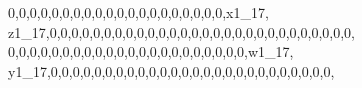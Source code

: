 \documentclass[]{article}
\newenvironment{Shaded}{\begin{snugshade}}{\end{snugshade}}
\newcommand{\DecValTok}[1]{\textcolor[rgb]{0.00,0.00,0.81}{#1}}
\newcommand{\NormalTok}[1]{#1}
\begin{document}
\begin{Shaded}
\begin{Highlighting}[]
\DecValTok{0}\NormalTok{,}\DecValTok{0}\NormalTok{,}\DecValTok{0}\NormalTok{,}\DecValTok{0}\NormalTok{,}\DecValTok{0}\NormalTok{,}\DecValTok{0}\NormalTok{,}\DecValTok{0}\NormalTok{,}\DecValTok{0}\NormalTok{,}\DecValTok{0}\NormalTok{,}\DecValTok{0}\NormalTok{,}\DecValTok{0}\NormalTok{,}\DecValTok{0}\NormalTok{,}\DecValTok{0}\NormalTok{,}\DecValTok{0}\NormalTok{,}\DecValTok{0}\NormalTok{,}\DecValTok{0}\NormalTok{,}\DecValTok{0}\NormalTok{,}\DecValTok{0}\NormalTok{,}\DecValTok{0}\NormalTok{,}\DecValTok{0}\NormalTok{,x1_}\DecValTok{17}\NormalTok{, z1_}\DecValTok{17}\NormalTok{,}\DecValTok{0}\NormalTok{,}\DecValTok{0}\NormalTok{,}\DecValTok{0}\NormalTok{,}\DecValTok{0}\NormalTok{,}\DecValTok{0}\NormalTok{,}\DecValTok{0}\NormalTok{,}\DecValTok{0}\NormalTok{,}\DecValTok{0}\NormalTok{,}\DecValTok{0}\NormalTok{,}\DecValTok{0}\NormalTok{,}\DecValTok{0}\NormalTok{,}\DecValTok{0}\NormalTok{,}\DecValTok{0}\NormalTok{,}\DecValTok{0}\NormalTok{,}\DecValTok{0}\NormalTok{,}\DecValTok{0}\NormalTok{,}\DecValTok{0}\NormalTok{,}\DecValTok{0}\NormalTok{,}\DecValTok{0}\NormalTok{,}\DecValTok{0}\NormalTok{,}\DecValTok{0}\NormalTok{,}\DecValTok{0}\NormalTok{,}\DecValTok{0}\NormalTok{,}\DecValTok{0}\NormalTok{,}\DecValTok{0}\NormalTok{,}\DecValTok{0}\NormalTok{,}\DecValTok{0}\NormalTok{,}\DecValTok{0}\NormalTok{,}
\DecValTok{0}\NormalTok{,}\DecValTok{0}\NormalTok{,}\DecValTok{0}\NormalTok{,}\DecValTok{0}\NormalTok{,}\DecValTok{0}\NormalTok{,}\DecValTok{0}\NormalTok{,}\DecValTok{0}\NormalTok{,}\DecValTok{0}\NormalTok{,}\DecValTok{0}\NormalTok{,}\DecValTok{0}\NormalTok{,}\DecValTok{0}\NormalTok{,}\DecValTok{0}\NormalTok{,}\DecValTok{0}\NormalTok{,}\DecValTok{0}\NormalTok{,}\DecValTok{0}\NormalTok{,}\DecValTok{0}\NormalTok{,}\DecValTok{0}\NormalTok{,}\DecValTok{0}\NormalTok{,}\DecValTok{0}\NormalTok{,}\DecValTok{0}\NormalTok{,}\DecValTok{0}\NormalTok{,}\DecValTok{0}\NormalTok{,w1_}\DecValTok{17}\NormalTok{, y1_}\DecValTok{17}\NormalTok{,}\DecValTok{0}\NormalTok{,}\DecValTok{0}\NormalTok{,}\DecValTok{0}\NormalTok{,}\DecValTok{0}\NormalTok{,}\DecValTok{0}\NormalTok{,}\DecValTok{0}\NormalTok{,}\DecValTok{0}\NormalTok{,}\DecValTok{0}\NormalTok{,}\DecValTok{0}\NormalTok{,}\DecValTok{0}\NormalTok{,}\DecValTok{0}\NormalTok{,}\DecValTok{0}\NormalTok{,}\DecValTok{0}\NormalTok{,}\DecValTok{0}\NormalTok{,}\DecValTok{0}\NormalTok{,}\DecValTok{0}\NormalTok{,}\DecValTok{0}\NormalTok{,}\DecValTok{0}\NormalTok{,}\DecValTok{0}\NormalTok{,}\DecValTok{0}\NormalTok{,}\DecValTok{0}\NormalTok{,}\DecValTok{0}\NormalTok{,}\DecValTok{0}\NormalTok{,}\DecValTok{0}\NormalTok{,}\DecValTok{0}\NormalTok{,}\DecValTok{0}\NormalTok{,}

\end{Highlighting}
\end{Shaded}
\end{document}

